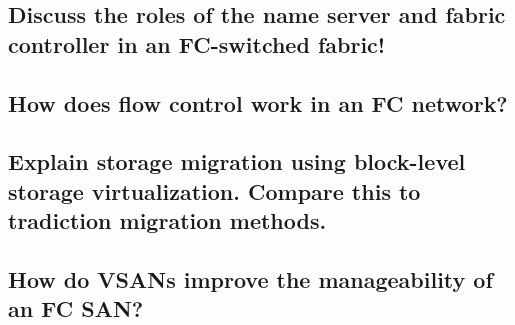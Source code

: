 \subsection{Discuss the roles of the name server and fabric controller in an FC-switched fabric!} %
\label{sub:discuss_the_roles_of_the_name_server_and_fabric_controller_in_an_fc_switched_fabric}


\subsection{How does flow control work in an FC network?} %
\label{sub:how_does_flow_control_work_in_an_fc_network}


\subsection{Explain storage migration using block-level storage virtualization. Compare this to tradiction migration methods.} %
\label{sub:explain_storage_migration_using_block_level_storage_virtualization_compare_this_to_tradiction_migration_methods_}


\subsection{How do VSANs improve the manageability of an FC SAN?} %
\label{sub:how_do_vsans_improve_the_manageability_of_an_fc_san}


